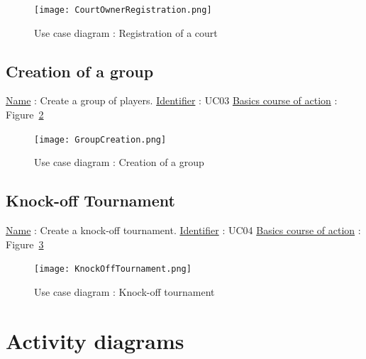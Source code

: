 \begin{figure}[!ht]
    \centering
    \texttt{[image: CourtOwnerRegistration.png]}
    \caption{Use case diagram : Registration of a court}
    \label{courtownerregfig}
\end{figure}
\FloatBarrier

\subsection{Creation of a group}

\noindent \underline{Name} : Create a group of players. \newline
\underline{Identifier} : UC03 \newline
\underline{Basics course of action} : Figure~\ref{groupcreationfig} \newline

\begin{figure}[!ht]
    \centering
    \texttt{[image: GroupCreation.png]}
    \caption{Use case diagram : Creation of a group}
    \label{groupcreationfig}
\end{figure}
\FloatBarrier

\subsection{Knock-off Tournament}

\noindent \underline{Name} : Create a knock-off tournament. \newline
\underline{Identifier} : UC04 \newline
\underline{Basics course of action} : Figure~\ref{knockofftournamentfig}\newline

\begin{figure}[!ht]
    \centering
    \texttt{[image: KnockOffTournament.png]}
    \caption{Use case diagram : Knock-off tournament}
    \label{knockofftournamentfig}
\end{figure}
\FloatBarrier

\section{Activity diagrams}

\newpage



